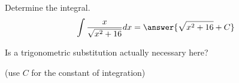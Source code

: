 \documentclass{ximera}
\author{Jason Miller}
\begin{document}
\begin{exercise}
Determine the integral.
\[
\int \frac{x}{\sqrt{x^{2}+16}} dx=\answer{ \sqrt{x^{2}+16} + C }
\]
\begin{feedback}
Is a trigonometric substitution actually necessary here?
\end{feedback}
(use $C$ for the constant of integration)


\end{exercise}
\end{document}
